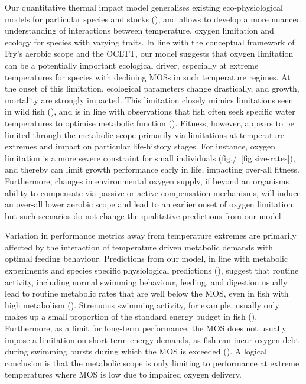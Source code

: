 \documentclass[11pt]{article}\usepackage[]{graphicx}\usepackage[]{color}
\begin{document}
Our quantitative thermal impact model generalises existing eco-physiological models for particular species and stocks (\cite{hufnagl_physiological_2011, holt_climate_2014,holt_climate_2015}), and allows to develop a more nuanced understanding of interactions between temperature, oxygen limitation and ecology for species with varying traits. In line with the conceptual framework of Fry's aerobic scope and the OCLTT, our model suggests that oxygen limitation can be a potentially important ecological driver, especially at extreme temperatures for species with declining MOSs in such temperature regimes. At the onset of this limitation, ecological parameters change drastically, and growth, mortality are strongly impacted. This limitation closely mimics limitations seen in wild fish (\cite{myrick_temperature_2000}), and is in line with observations that fish often seek specific water temperatures to optimise metabolic function (\cite[e.g., ][]{armstrong_diel_2013,claireaux_physiology_1995}). Fitness, however, appears to be limited through the metabolic scope primarily via limitations at temperature extremes and impact on particular life-history stages. For instance, oxygen limitation is a more severe constraint for small individuals (fig./~\ref{fig:size-rates}), and thereby can limit growth performance early in life, impacting over-all fitness. Furthermore, changes in environmental oxygen supply, if beyond an organisms ability to compensate via passive or active compensation mechanisms, will induce an over-all lower aerobic scope and lead to an earlier onset of oxygen limitation, but such scenarios do not change the qualitative predictions from our model.

Variation in performance metrics away from temperature extremes are primarily affected by the interaction of temperature driven metabolic demands with optimal feeding behaviour. Predictions from our model, in line with metabolic experiments and species specific physiological predictions (\cite[e.g., ][]{holt_climate_2014}), suggest that routine activity, including normal swimming behaviour, feeding, and digestion usually lead to routine metabolic rates that are well below the MOS, even in fish with high metabolism (\cite{lucas_utilization_1992,priede_metabolic_1985}). Strenuous swimming activity, for example, usually only makes up a small proportion of the standard energy budget in fish (\cite{priede_natural_1977,priede_metabolic_1985}). Furthermore, as a limit for long-term performance, the MOS does not usually impose a limitation on short term energy demands, as fish can incur oxygen debt during swimming bursts during which the MOS is exceeded (\cite{brett_metabolic_1972,priede_metabolic_1985}). A logical conclusion is that the metabolic scope is only limiting to performance at extreme temperatures where MOS is low due to impaired oxygen delivery.
\end{document}

